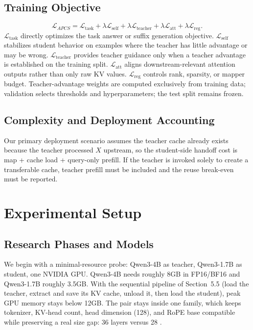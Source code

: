 \documentclass[10pt]{article}
\newcommand{\method}{APCS}
\begin{document}
\subsection{Training Objective}
\begin{equation}
  \mathcal{L}_{\method} = \mathcal{L}_{\mathrm{task}} + \lambda \mathcal{L}_{\mathrm{self}} +
  \lambda \mathcal{L}_{\mathrm{teacher}} + \lambda \mathcal{L}_{\mathrm{att}} +
  \lambda \mathcal{L}_{\mathrm{reg}}.
\label{eq:loss}
\end{equation}
$\mathcal{L}_{\mathrm{task}}$ directly optimizes the task answer or suffix generation objective.
$\mathcal{L}_{\mathrm{self}}$ stabilizes student behavior on examples where the teacher has little
advantage or may be wrong. $\mathcal{L}_{\mathrm{teacher}}$ provides teacher guidance only when a
teacher advantage is established on the training split. $\mathcal{L}_{\mathrm{att}}$ aligns
downstream-relevant attention outputs rather than only raw KV values. $\mathcal{L}_{\mathrm{reg}}$
controls rank, sparsity, or mapper budget. Teacher-advantage weights are computed exclusively from
training data; validation selects thresholds and hyperparameters; the test split remains frozen.

\subsection{Complexity and Deployment Accounting}
Our primary deployment scenario assumes the teacher cache already exists because the teacher
processed $X$ upstream, so the student-side handoff cost is map + cache load + query-only prefill.
If the teacher is invoked solely to create a transferable cache, teacher prefill must be included
and the reuse break-even must be reported.

\section{Experimental Setup}
\subsection{Research Phases and Models}
We begin with a minimal-resource probe: Qwen3-4B as teacher, Qwen3-1.7B as student, one NVIDIA GPU.
Qwen3-4B needs roughly 8GB in FP16/BF16 and Qwen3-1.7B roughly 3.5GB. With the sequential pipeline
of Section~5.5 (load the teacher, extract and save its KV cache, unload it, then load the
student), peak GPU memory stays below 12GB. The pair stays inside one family, which keeps
tokenizer, KV-head count, head dimension (128), and RoPE base compatible while preserving a real
size gap: 36 layers versus 28 \cite{yang2025qwen3}.
\end{document}
